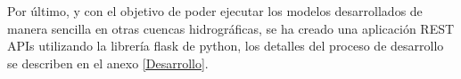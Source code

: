 Por último, y con el objetivo de poder ejecutar los modelos desarrollados de manera sencilla en otras cuencas hidrográficas, se ha creado
una aplicación REST APIs  utilizando la librería flask de python, los detalles del proceso de desarrollo se describen en el anexo \ref{Desarrollo}.

























